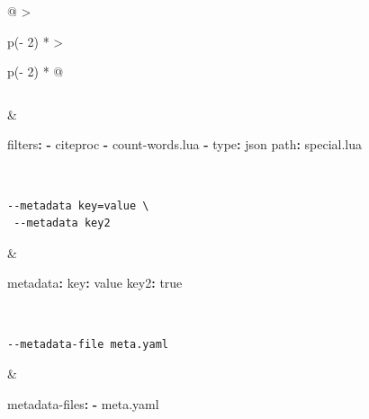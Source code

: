 \documentclass[
  b5paper
]{book}
\newenvironment{Shaded}{}{}
\newcommand{\AttributeTok}[1]{\textcolor[rgb]{0.49,0.56,0.16}{#1}}
\newcommand{\CharTok}[1]{\textcolor[rgb]{0.25,0.44,0.63}{#1}}
\newcommand{\FunctionTok}[1]{\textcolor[rgb]{0.02,0.16,0.49}{#1}}
\newcommand{\KeywordTok}[1]{\textcolor[rgb]{0.00,0.44,0.13}{\textbf{#1}}}
\begin{document}
\begin{longtable}[]{@{}
  >{\raggedright\arraybackslash}p{(\columnwidth - 2\tabcolsep) * }
  >{\raggedright\arraybackslash}p{(\columnwidth - 2\tabcolsep) * }@{}}
\begin{minipage}[t]{\linewidth}
\begin{verbatim}
\end{verbatim}
\end{minipage} & \begin{minipage}[t]{\linewidth}\raggedright
\begin{Shaded}
\begin{Highlighting}[]
\FunctionTok{filters}\KeywordTok{:}
\AttributeTok{  }\KeywordTok{{-}}\AttributeTok{ citeproc}
\AttributeTok{  }\KeywordTok{{-}}\AttributeTok{ count{-}words.lua}
\AttributeTok{  }\KeywordTok{{-}}\AttributeTok{ }\FunctionTok{type}\KeywordTok{:}\AttributeTok{ json}
\AttributeTok{    }\FunctionTok{path}\KeywordTok{:}\AttributeTok{ special.lua}
\end{Highlighting}
\end{Shaded}
\end{minipage} \\
\begin{minipage}[t]{\linewidth}\raggedright
\begin{verbatim}
--metadata key=value \
 --metadata key2
\end{verbatim}
\end{minipage} & \begin{minipage}[t]{\linewidth}\raggedright
\begin{Shaded}
\begin{Highlighting}[]
\FunctionTok{metadata}\KeywordTok{:}
\AttributeTok{  }\FunctionTok{key}\KeywordTok{:}\AttributeTok{ value}
\AttributeTok{  }\FunctionTok{key2}\KeywordTok{:}\AttributeTok{ }\CharTok{true}
\end{Highlighting}
\end{Shaded}
\end{minipage} \\
\begin{minipage}[t]{\linewidth}\raggedright
\begin{verbatim}
--metadata-file meta.yaml
\end{verbatim}
\end{minipage} & \begin{minipage}[t]{\linewidth}\raggedright
\begin{Shaded}
\begin{Highlighting}[]
\FunctionTok{metadata{-}files}\KeywordTok{:}
\AttributeTok{  }\KeywordTok{{-}}\AttributeTok{ meta.yaml}
\end{Highlighting}
\end{Shaded}


\end{minipage}
\end{longtable}
\end{document}
